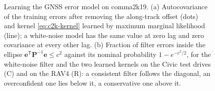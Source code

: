 \begin{figure}[!t]
{}
\caption{Learning the GNSS error model on comma2k19. (a) Autocovariance of the training errors after removing the along-track offset (dots) and kernel \eqref{eq:c2k-kernel} learned by maximum marginal likelihood (line); a white-noise model has the same value at zero lag and zero covariance at every other lag. (b) Fraction of filter errors inside the ellipse $\mathbf{e}^{\mathsf T}\mathbf{P}^{-1}\mathbf{e}\le c^{2}$ against its nominal probability $1-e^{-c^{2}/2}$, for the white-noise filter and the two learned kernels on the Civic test drives (C) and on the RAV4 (R): a consistent filter follows the diagonal, an overconfident one lies below it, a conservative one above it.}
\label{fig:c2k-learning}
\end{figure}

